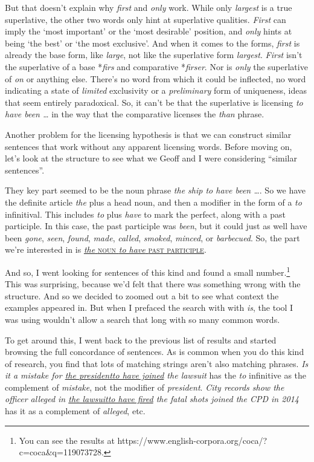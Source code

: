 But that doesn't explain why \textit{first} and \textit{only} work. While only \textit{largest} is a true superlative, the other two words only hint at superlative qualities. \textit{First} can imply the `most important' or the `most desirable' position, and \textit{only} hints at being `the best' or `the most exclusive'. And when it comes to the forms, \textit{first} is already the base form, like \textit{large}, not like the superlative form \textit{largest}. \textit{First} isn't the superlative of a base *\textit{firs} and comparative *\textit{firser}. Nor is \textit{only} the superlative of \textit{on} or anything else. There's no word from which it could be inflected, no word indicating a state of \textit{limited} exclusivity or a \textit{preliminary} form of uniqueness, ideas that seem entirely paradoxical. So, it can't be that the superlative is licensing \textit{to have been \dots} in the way that the comparative licenses the \textit{than} phrase.

Another problem for the licensing hypothesis is that we can construct similar sentences that work without any apparent licensing words. Before moving on, let's look at the structure to see what we Geoff and I were considering ``similar sentences''.

They key part seemed to be the noun phrase \textit{the ship to have been \dots}. So we have the definite article \textit{the} plus a head noun, and then a modifier in the form of a \textit{to} infinitival. This includes \textit{to} plus \textit{have} to mark the perfect, along with a past participle. In this case, the past participle was \textit{been}, but it could just as well have been \textit{gone}, \textit{seen}, \textit{found}, \textit{made}, \textit{called}, \textit{smoked}, \textit{minced}, or \textit{barbecued}. So, the part we're interested in is \uline{\textit{the} \textsc{noun} \textit{to have} \textsc{past participle}}.

And so, I went looking for sentences of this kind and found a small number.\footnote{You can see the results at https://www.english-corpora.org/coca/?c=coca\&q=119073728.} This was surprising, because we'd felt that there was something wrong with the structure. And so we decided to zoomed out a bit to see what context the examples appeared in. But when I prefaced the search with with \textit{is}, the tool I was using wouldn't allow a search that long with so many common words.

To get around this, I went back to the previous list of results and started browsing the full concordance of sentences. As is common when you do this kind of research, you find that lots of matching strings aren't also matching phrases. \textit{Is it a mistake \ob for \uline{the president\cb to have joined} the lawsuit} has the \textit{to} infinitive as the complement of \textit{mistake}, not the modifier of \textit{president}. \textit{City records show the officer alleged \ob in \uline{the lawsuit\cb to have fired} the fatal shots joined the CPD in 2014} has it as a complement of \textit{alleged}, etc.

